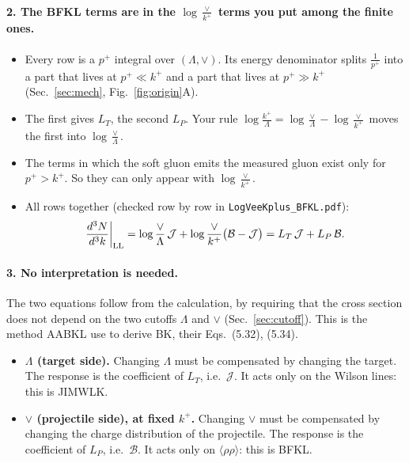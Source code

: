 \documentclass[11pt]{article}
\numberwithin{equation}{section}
\newcommand{\JJ}{\mathcal J}
\newcommand{\BB}{\mathcal B}
\newcommand{\LT}{L_T}
\newcommand{\LP}{L_P}
\begin{document}
\paragraph{2. The BFKL terms are in the $\log\frac{\vee}{k^+}$ terms you put among the finite ones.}
\begin{itemize}
\item Every row is a $p^+$ integral over $(\Lambda,\vee)$. Its energy denominator splits $\frac1{p^+}$ into a part that lives at $p^+\ll k^+$ and a part that lives at $p^+\gg k^+$ (Sec.~\ref{sec:mech}, Fig.~\ref{fig:origin}A).
\item The first gives $\LT$, the second $\LP$. Your rule $\log\frac{k^+}{\Lambda}=\log\frac\vee\Lambda-\log\frac{\vee}{k^+}$ moves the first into $\log\frac\vee\Lambda$.
\item The terms in which the soft gluon emits the measured gluon exist only for $p^+>k^+$. So they can only appear with $\log\frac{\vee}{k^+}$.
\item All rows together (checked row by row in \texttt{LogVeeKplus\_BFKL.pdf}):
\begin{equation}
\frac{d^3N}{d^3k}\bigg|_{\rm LL}=\log\frac{\vee}{\Lambda}\,\JJ+\log\frac{\vee}{k^+}\big(\BB-\JJ\big)=\LT\,\JJ+\LP\,\BB.
\label{eq:LL}
\end{equation}
\end{itemize}

\paragraph{3. No interpretation is needed.} The two equations follow from the calculation, by requiring that the cross section does not depend on the two cutoffs $\Lambda$ and $\vee$ (Sec.~\ref{sec:cutoff}). This is the method AABKL use to derive BK, their Eqs.~(5.32), (5.34).
\begin{itemize}
\item \textbf{$\Lambda$ (target side).} Changing $\Lambda$ must be compensated by changing the target. The response is the coefficient of $\LT$, i.e.\ $\JJ$. It acts only on the Wilson lines: this is JIMWLK.
\item \textbf{$\vee$ (projectile side), at fixed $k^+$.} Changing $\vee$ must be compensated by changing the charge distribution of the projectile. The response is the coefficient of $\LP$, i.e.\ $\BB$. It acts only on $\langle\rho\rho\rangle$: this is BFKL.
\end{itemize}
\end{document}
